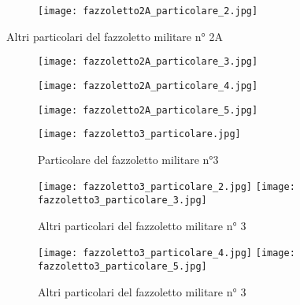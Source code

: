 \begin{figure}[h]
	\centering
		\texttt{[image: fazzoletto2A\_particolare\_2.jpg]}
	\caption{}
	\label{fig:fazzoletto2A_particolare_2}
\end{figure}

\newpage

Altri particolari del fazzoletto militare  n° 2A

\begin{figure}[h]
	\centering
		\texttt{[image: fazzoletto2A\_particolare\_3.jpg]}
	\caption{}
	\label{fig:fazzoletto2A_particolare_3}
\end{figure}

\newpage

\begin{figure}[h]
	\centering
		\texttt{[image: fazzoletto2A\_particolare\_4.jpg]}
	\caption{}
	\label{fig:fazzoletto2A_particolare_4}
\end{figure}

\newpage

\begin{figure}[h]
	\centering
		\texttt{[image: fazzoletto2A\_particolare\_5.jpg]}
	\caption{}
	\label{fig:fazzoletto2A_particolare_5}
\end{figure}

\newpage

\begin{figure}[h]
	\centering
		\texttt{[image: fazzoletto3\_particolare.jpg]}
	\caption{Particolare del fazzoletto militare n°3}
	\label{fig:fazzoletto3_particolare}
\end{figure}

\newpage

\begin{figure}[h]
	\centering
		\texttt{[image: fazzoletto3\_particolare\_2.jpg]}
	\centering
		\texttt{[image: fazzoletto3\_particolare\_3.jpg]}
	\caption{Altri particolari del fazzoletto militare n° 3}
	\label{fig:fazzoletto3_particolare_2_3}
\end{figure}

\newpage

\begin{figure}[h]
	\centering
		\texttt{[image: fazzoletto3\_particolare\_4.jpg]}
	\centering
		\texttt{[image: fazzoletto3\_particolare\_5.jpg]}
	\caption{Altri particolari del fazzoletto militare n° 3}
	\label{fig:fazzoletto3_particolare_4_5}
\end{figure}

